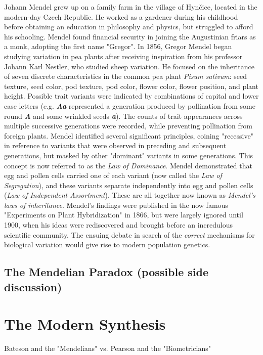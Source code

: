 Johann Mendel grew up on a family farm in the village of Hynčice, located in the modern-day Czech Republic. He worked as a gardener during his childhood before obtaining an education in philosophy and physics, but struggled to afford his schooling. Mendel found financial security in joining the Augustinian friars as a monk, adopting the first name "Gregor".  In 1856, Gregor Mendel began studying variation in pea plants after receiving inspiration from his professor Johann Karl Nestler, who studied sheep variation.\cite{henig_2000} He focused on the inheritance of seven discrete characteristics in the common pea plant \textit{Pisum sativum}: seed texture, seed color, pod texture, pod color, flower color, flower position, and plant height. Possible trait variants were indicated by combinations of capital and lower case letters (e.g. \textbf{\textit{Aa}} represented a generation produced by pollination from some round \textbf{\textit{A}} and some wrinkled seeds \textbf{\textit{a}}). The counts of trait appearances across multiple successive generations were recorded, while preventing pollination from foreign plants. Mendel identified several significant principles, coining "recessive" in reference to variants that were observed in preceding and subsequent generations, but masked by other "dominant" variants in some generations. This concept is now referred to as the \textit{Law of Dominance}. Mendel demonstrated that egg and pollen cells carried one of each variant (now called the \textit{Law of Segregation}), and these variants separate independently into egg and pollen cells (\textit{Law of Independent Assortment}). These are all together now known as \textit{Mendel's laws of inheritance}. Mendel's findings were published in the now famous "Experiments on Plant Hybridization" \cite{mendel_1865} in 1866, but were largely ignored until 1900, when his ideas were rediscovered and brought before an incredulous scientific community. The ensuing debate in search of the \textit{correct} mechanisms for biological variation would give rise to modern population genetics. \cite{bowler_2003}

\subsection{The Mendelian Paradox (possible side discussion)}


\newpage
\section{The Modern Synthesis}
Bateson and the "Mendelians" vs. Pearson and the "Biometricians"\cite{bateson_1902}



